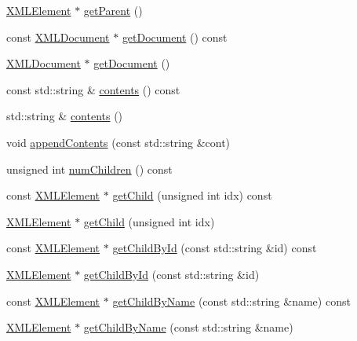 \begin{DoxyCompactItemize}
\item 
\hyperlink{classXMLDOM_1_1XMLElement}{X\+M\+L\+Element} $\ast$ \hyperlink{classXMLDOM_1_1XMLElement_aa8b34dd58162dca0c55a099f38322997}{get\+Parent} ()
\item 
const \hyperlink{classXMLDOM_1_1XMLDocument}{X\+M\+L\+Document} $\ast$ \hyperlink{classXMLDOM_1_1XMLElement_a7ca2364a51efbb2a2fae927ed44eb7a6}{get\+Document} () const 
\item 
\hyperlink{classXMLDOM_1_1XMLDocument}{X\+M\+L\+Document} $\ast$ \hyperlink{classXMLDOM_1_1XMLElement_a25d23e71643b55728f910604b43beed0}{get\+Document} ()
\item 
const std\+::string \& \hyperlink{classXMLDOM_1_1XMLElement_a233ff65ad65b92fee2f145d2ba059c3a}{contents} () const 
\item 
std\+::string \& \hyperlink{classXMLDOM_1_1XMLElement_a8ea797d366a39b336d3430f507363c39}{contents} ()
\item 
void \hyperlink{classXMLDOM_1_1XMLElement_a599cf001586620a89628d63b342378e2}{append\+Contents} (const std\+::string \&cont)
\item 
unsigned int \hyperlink{classXMLDOM_1_1XMLElement_a17fbc9119c8cd50b6f689e0b64084348}{num\+Children} () const 
\item 
const \hyperlink{classXMLDOM_1_1XMLElement}{X\+M\+L\+Element} $\ast$ \hyperlink{classXMLDOM_1_1XMLElement_a91cd5c70c6d67bb74d357f74e8ec6de5}{get\+Child} (unsigned int idx) const 
\item 
\hyperlink{classXMLDOM_1_1XMLElement}{X\+M\+L\+Element} $\ast$ \hyperlink{classXMLDOM_1_1XMLElement_ae719f0588c09f90d5d5ca1e86d56222d}{get\+Child} (unsigned int idx)
\item 
const \hyperlink{classXMLDOM_1_1XMLElement}{X\+M\+L\+Element} $\ast$ \hyperlink{classXMLDOM_1_1XMLElement_a9dc8e59b0e865711da58b9eaae6ad910}{get\+Child\+By\+Id} (const std\+::string \&id) const 
\item 
\hyperlink{classXMLDOM_1_1XMLElement}{X\+M\+L\+Element} $\ast$ \hyperlink{classXMLDOM_1_1XMLElement_a806d22ef3eb9402140e1efc544fb4ea0}{get\+Child\+By\+Id} (const std\+::string \&id)
\item 
const \hyperlink{classXMLDOM_1_1XMLElement}{X\+M\+L\+Element} $\ast$ \hyperlink{classXMLDOM_1_1XMLElement_a7d42b4e451aa93b60b6bb5e2e582da0e}{get\+Child\+By\+Name} (const std\+::string \&name) const 
\item 
\hyperlink{classXMLDOM_1_1XMLElement}{X\+M\+L\+Element} $\ast$ \hyperlink{classXMLDOM_1_1XMLElement_a03e059f16c2ee6ca88e25c0c8ae71420}{get\+Child\+By\+Name} (const std\+::string \&name)

\end{DoxyCompactItemize}

